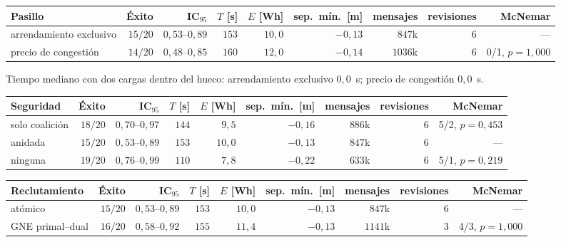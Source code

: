 \begin{center}\small
\begin{tabular}{@{}lrrrrrrrr@{}}
\toprule
Pasillo & Éxito & IC$_{95}$ & $T$ [s] & $E$ [Wh] & sep.\ mín.\ [m] & mensajes & revisiones & McNemar \\
\midrule
arrendamiento exclusivo & $15/20$ & $0{,}53$--$0{,}89$ & $153$ & $10{,}0$ & $-0{,}13$ & $847$k & $6$ & — \\
precio de congestión & $14/20$ & $0{,}48$--$0{,}85$ & $160$ & $12{,}0$ & $-0{,}14$ & $1036$k & $6$ & 0/1, $p=1{,}000$ \\
\bottomrule
\end{tabular}
\end{center}

Tiempo mediano con dos cargas dentro del hueco: arrendamiento exclusivo $0{,}0$~s; precio de congestión $0{,}0$~s.

\begin{center}\small
\begin{tabular}{@{}lrrrrrrrr@{}}
\toprule
Seguridad & Éxito & IC$_{95}$ & $T$ [s] & $E$ [Wh] & sep.\ mín.\ [m] & mensajes & revisiones & McNemar \\
\midrule
solo coalición & $18/20$ & $0{,}70$--$0{,}97$ & $144$ & $9{,}5$ & $-0{,}16$ & $886$k & $6$ & 5/2, $p=0{,}453$ \\
anidada & $15/20$ & $0{,}53$--$0{,}89$ & $153$ & $10{,}0$ & $-0{,}13$ & $847$k & $6$ & — \\
ninguna & $19/20$ & $0{,}76$--$0{,}99$ & $110$ & $7{,}8$ & $-0{,}22$ & $633$k & $6$ & 5/1, $p=0{,}219$ \\
\bottomrule
\end{tabular}
\end{center}

\begin{center}\small
\begin{tabular}{@{}lrrrrrrrr@{}}
\toprule
Reclutamiento & Éxito & IC$_{95}$ & $T$ [s] & $E$ [Wh] & sep.\ mín.\ [m] & mensajes & revisiones & McNemar \\
\midrule
atómico & $15/20$ & $0{,}53$--$0{,}89$ & $153$ & $10{,}0$ & $-0{,}13$ & $847$k & $6$ & — \\
GNE primal--dual & $16/20$ & $0{,}58$--$0{,}92$ & $155$ & $11{,}4$ & $-0{,}13$ & $1141$k & $3$ & 4/3, $p=1{,}000$ \\
\bottomrule
\end{tabular}
\end{center}


